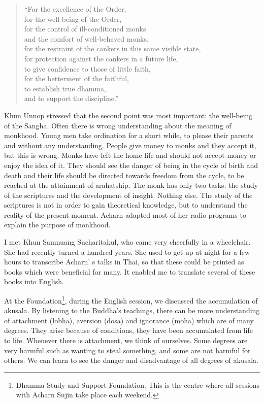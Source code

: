 \begin{verse}
``For the excellence of the Order, \\
for the well-being of the Order, \\
for the control of ill-conditioned monks \\
and the comfort of well-behaved monks,\\ 
for the restraint of the cankers in this same visible state,\\ 
for protection against the cankers in a future life,\\ 
to give confidence to those of little faith,\\ 
for the betterment of the faithful,\\ 
to establish true dhamma,\\ 
and to support the discipline.'' \\
\end{verse}

Khun Unnop stressed that the second point was most important: the well-being 
of the Sangha. Often there is wrong understanding about the meaning of monkhood. Young men take ordination for a short while, to please their parents and 
without any understanding. People give money to monks and they accept it, but 
this is wrong. Monks have left the home life and should not accept money or 
enjoy the idea of it. They should see the danger of being in the cycle of birth 
and death and their life should be directed towards freedom from the cycle, to be reached at the attainment of arahatship. The monk has only two tasks: the 
study of the scriptures and the development of insight. Nothing else. The study 
of the scriptures is not in order to gain theoretical knowledge, but to understand 
the reality of the present moment. Acharn adapted most of her radio programs to 
explain the purpose of monkhood. 

I met Khun Samnuang Sucharitakul, who came very cheerfully in a wheelchair. 
She had recently turned a hundred years. She used to get up at night for a few 
hours to transcribe Acharn' s talks in Thai, so that these could be printed as 
books which were beneficial for many. It enabled me to translate several of 
these books into English. 

At the Foundation\footnote{Dhamma Study and Support Foundation. This is the centre where all sessions with Acharn 
Sujin take place each weekend.}, during the English session, we discussed the accumulation 
of akusala. By listening to the Buddha's teachings, there can be more understanding of attachment (lobha), aversion (dosa) and ignorance (moha) which are 
of many degrees. They arise because of conditions, they have been accumulated 
from life to life. Whenever there is attachment, we think of ourselves. Some degrees are very harmful such as wanting to steal something, and some are not 
harmful for others. We can learn to see the danger and disadvantage of all degrees of akusala. 

